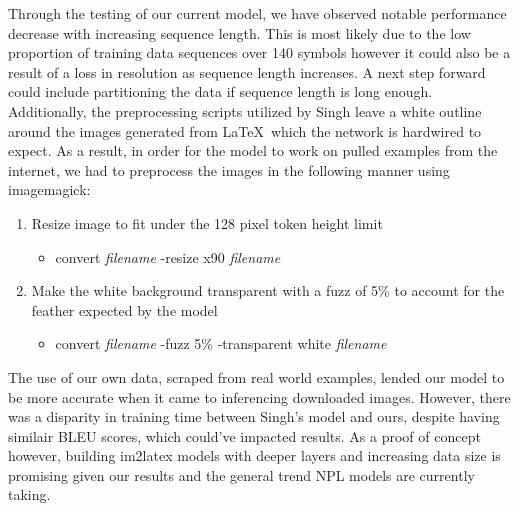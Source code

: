 \documentclass{article}
\begin{document}
Through the testing of our current model, we have observed notable performance
decrease with increasing sequence length. This is most likely due to the low
proportion of training data sequences over 140 symbols however it could also be
a result of a loss in resolution as sequence length increases. A next step
forward could include partitioning the data if sequence length is long enough.
Additionally, the preprocessing scripts utilized by
Singh \parencite{singh2018teaching} leave a white outline around the images generated
from \LaTeX\ which the network is hardwired to expect. As a result, in order for
the model to work on pulled examples from the internet, we had to preprocess the
images in the following manner using imagemagick:
\begin{enumerate}
  \item Resize image to fit under the 128 pixel token height limit
  \begin{itemize}
    \item convert \textit{filename} -resize x90 \textit{filename}
  \end{itemize}
  \item Make the white background transparent with a fuzz of 5\% to account for
  the feather expected by the model
  \begin{itemize}
    \item convert \textit{filename} -fuzz 5\% -transparent white \textit{filename}
  \end{itemize} 
\end{enumerate}
The use of our own data, scraped from real world examples, lended our model to be
more accurate when it came to inferencing downloaded images. However, there was
a disparity in training time between Singh's model and ours, despite having
similair BLEU scores, which could've impacted results. As a proof of concept
however, building im2latex models with deeper layers and increasing data size is
promising given our results and the general trend NPL models are currently taking.




\printbibliography{}
\end{document}
